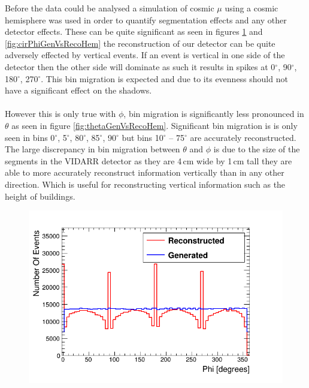 Before the data could be analysed a simulation of cosmic $\mu$ using a cosmic hemisphere was used in order to quantify segmentation effects and any other detector effects. These can be quite significant as seen in figures \ref{fig:phiGenVsRecoHem} and \ref{fig:cirPhiGenVsRecoHem} the reconstruction of our detector can be quite adversely effected by vertical events. If an event is vertical in one side of the detector then the other side will dominate as such it results in spikes at 0$^\circ$, 90$^\circ$, 180$^\circ$, 270$^\circ$. This bin migration is expected and due to its evenness should not have a significant effect on the shadows. 
\\\\ However this is only true with $\phi$, bin migration is significantly less pronounced in $\theta$ as seen in figure \ref{fig:thetaGenVsRecoHem}. Significant bin migration is is only seen in bins 0$^\circ$, 5$^\circ$, 80$^\circ$, 85$^\circ$, 90$^\circ$ but bins 10$^\circ$ -- 75$^\circ$ are accurately reconstructed. The large discrepancy in bin migration between $\theta$ and $\phi$ is due to the size of the segments in the VIDARR detector as they are 4\,cm wide by 1\,cm tall they are able to more accurately reconstruct information vertically than in any other direction. Which is useful for reconstructing vertical information such as the height of buildings. 
\begin{figure}[htbp]
 \centering
 \includegraphics[width=0.8\linewidth]{Chapter5/Figs/Raster/hemispherePhiCompare.png}
 \label{fig:phiGenVsRecoHem}
\end{figure}

